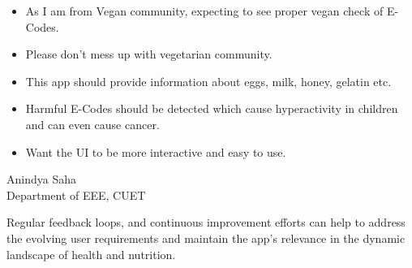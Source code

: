 \documentclass[a4paper,12pt]{report}
\begin{document}
\parbox{.69\linewidth}{
	\begin{itemize}
		\item As I am from Vegan community, expecting to see proper vegan check of E-Codes.
		\item Please don't mess up with vegetarian community.
		\item This app should provide information about eggs, milk, honey, gelatin etc.
		\item Harmful E-Codes should be detected which cause hyperactivity in children and can even cause cancer.
		\item Want the UI to be more interactive and easy to use.
	\end{itemize}}
\parbox[m]{.3\linewidth}{
\raggedleft
Anindya Saha\\
{\footnotesize
Department of EEE, CUET}\\
}

Regular feedback loops, and continuous improvement efforts can help to address the evolving user requirements and maintain the app's relevance in the dynamic landscape of health and nutrition.
\end{document}
